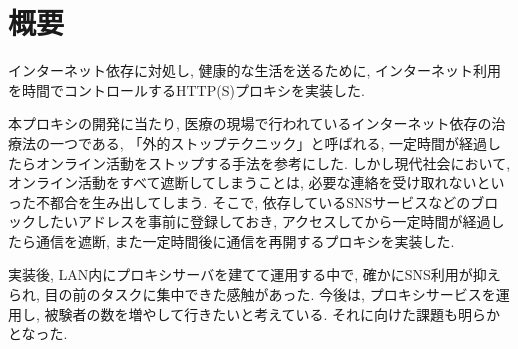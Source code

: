 \documentclass[10pt,a4paper,uplatex,a4j,dvipdfmx]{jsarticle}
\begin{document}
    \section*{概要}
    
    インターネット依存に対処し, 健康的な生活を送るために, インターネット利用を時間でコントロールするHTTP(S)プロキシを実装した.

    本プロキシの開発に当たり, 医療の現場で行われているインターネット依存の治療法の一つである, 「外的ストップテクニック」と呼ばれる, 一定時間が経過したらオンライン活動をストップする手法を参考にした.
    しかし現代社会において, オンライン活動をすべて遮断してしまうことは, 必要な連絡を受け取れないといった不都合を生み出してしまう. そこで, 依存しているSNSサービスなどのブロックしたいアドレスを事前に登録しておき, アクセスしてから一定時間が経過したら通信を遮断, また一定時間後に通信を再開するプロキシを実装した.
    
    実装後, LAN内にプロキシサーバを建てて運用する中で, 確かにSNS利用が抑えられ, 目の前のタスクに集中できた感触があった.
    今後は, プロキシサービスを運用し, 被験者の数を増やして行きたいと考えている. それに向けた課題も明らかとなった.

    \newpage
\end{document}
